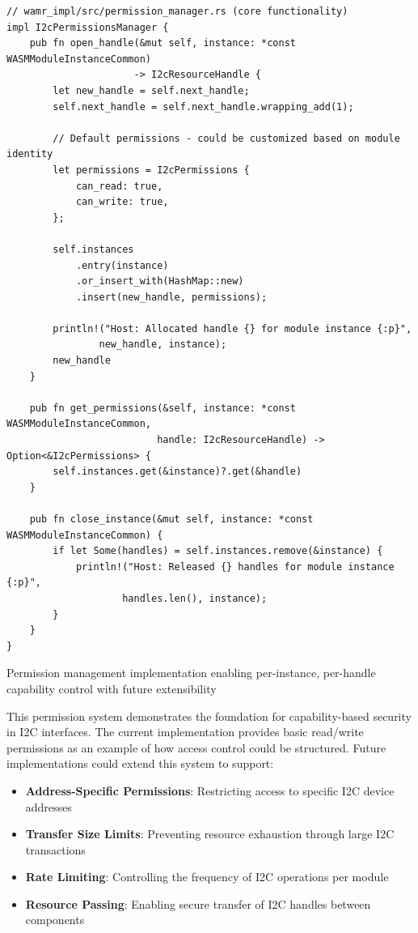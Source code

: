 \begin{listing}[H]
\begin{verbatim}
// wamr_impl/src/permission_manager.rs (core functionality)
impl I2cPermissionsManager {
    pub fn open_handle(&mut self, instance: *const WASMModuleInstanceCommon) 
                      -> I2cResourceHandle {
        let new_handle = self.next_handle;
        self.next_handle = self.next_handle.wrapping_add(1);
        
        // Default permissions - could be customized based on module identity
        let permissions = I2cPermissions {
            can_read: true,
            can_write: true,
        };
        
        self.instances
            .entry(instance)
            .or_insert_with(HashMap::new)
            .insert(new_handle, permissions);
            
        println!("Host: Allocated handle {} for module instance {:p}", 
                new_handle, instance);
        new_handle
    }

    pub fn get_permissions(&self, instance: *const WASMModuleInstanceCommon, 
                          handle: I2cResourceHandle) -> Option<&I2cPermissions> {
        self.instances.get(&instance)?.get(&handle)
    }

    pub fn close_instance(&mut self, instance: *const WASMModuleInstanceCommon) {
        if let Some(handles) = self.instances.remove(&instance) {
            println!("Host: Released {} handles for module instance {:p}", 
                    handles.len(), instance);
        }
    }
}
\end{verbatim}
\caption{Permission management implementation enabling per-instance, per-handle capability control with future extensibility}
\label{lst:permission-implementation}
\end{listing}

This permission system demonstrates the foundation for capability-based security in I2C interfaces. The current implementation provides basic read/write permissions as an example of how access control could be structured. Future implementations could extend this system to support:

\begin{itemize}
    \item \textbf{Address-Specific Permissions}: Restricting access to specific I2C device addresses
    \item \textbf{Transfer Size Limits}: Preventing resource exhaustion through large I2C transactions
    \item \textbf{Rate Limiting}: Controlling the frequency of I2C operations per module
    \item \textbf{Resource Passing}: Enabling secure transfer of I2C handles between components
\end{itemize}

